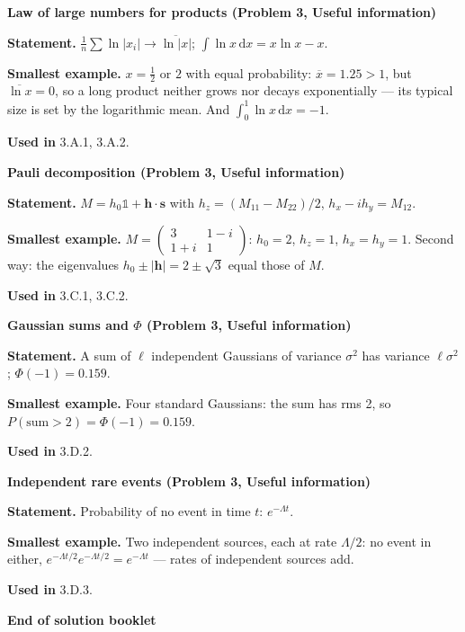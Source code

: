 \documentclass[11pt,a4paper]{article}
\newcommand{\dd}{\mathrm d}
\newcommand{\id}{\mathds 1}
\newcommand{\avg}[1]{\overline{#1}}
\newcommand{\smallheading}[1]{\par\Needspace{6\baselineskip}\medskip\textbf{#1}\par}
\begin{document}
\smallheading{Law of large numbers for products (Problem 3, Useful information)}
\textbf{Statement.} $\frac1n\sum\ln|x_i|\to\avg{\ln|x|}$; $\int\ln x\,\dd x=x\ln x-x$.\par
\textbf{Smallest example.} $x=\frac12$ or $2$ with equal probability: $\avg x=1.25>1$, but $\avg{\ln x}=0$, so a long product neither grows nor decays exponentially --- its typical size is set by the logarithmic mean. And $\int_0^1\ln x\,\dd x=-1$.\par
\textbf{Used in} 3.A.1, 3.A.2.

\smallheading{Pauli decomposition (Problem 3, Useful information)}
\textbf{Statement.} $M=h_0\id+\bm h\cdot\bm s$ with $h_z=(M_{11}-M_{22})/2$, $h_x-ih_y=M_{12}$.\par
\textbf{Smallest example.} $M=\begin{pmatrix}3&1-i\\1+i&1\end{pmatrix}$: $h_0=2$, $h_z=1$, $h_x=h_y=1$. Second way: the eigenvalues $h_0\pm|\bm h|=2\pm\sqrt3$ equal those of $M$.\par
\textbf{Used in} 3.C.1, 3.C.2.

\smallheading{Gaussian sums and $\Phi$ (Problem 3, Useful information)}
\textbf{Statement.} A sum of $\ell$ independent Gaussians of variance $\sigma^2$ has variance $\ell\sigma^2$; $\Phi(-1)=0.159$.\par
\textbf{Smallest example.} Four standard Gaussians: the sum has rms 2, so $P(\text{sum}>2)=\Phi(-1)=0.159$.\par
\textbf{Used in} 3.D.2.

\smallheading{Independent rare events (Problem 3, Useful information)}
\textbf{Statement.} Probability of no event in time $t$: $e^{-\Lambda t}$.\par
\textbf{Smallest example.} Two independent sources, each at rate $\Lambda/2$: no event in either, $e^{-\Lambda t/2}e^{-\Lambda t/2}=e^{-\Lambda t}$ --- rates of independent sources add.\par
\textbf{Used in} 3.D.3.

\vfill
\begin{center}\textbf{End of solution booklet}\end{center}
\end{document}

